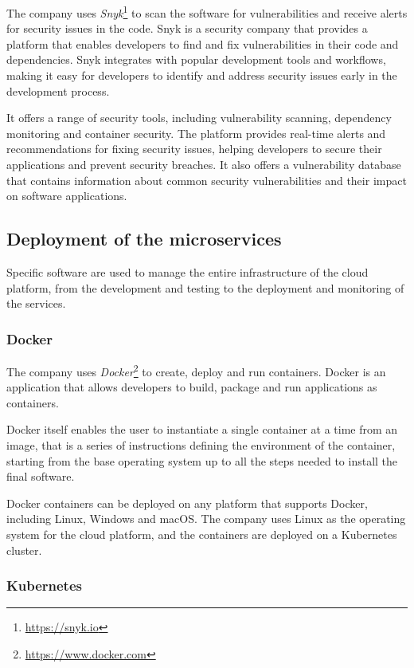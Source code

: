 The company uses \textit{Snyk}\footnote{\url{https://snyk.io}} to scan the software for vulnerabilities and receive alerts for security issues in the code. Snyk is a security company that provides a platform that enables developers to find and fix vulnerabilities in their code and dependencies. Snyk integrates with popular development tools and workflows, making it easy for developers to identify and address security issues early in the development process.

It offers a range of security tools, including vulnerability scanning, dependency monitoring and container security. The platform provides real-time alerts and recommendations for fixing security issues, helping developers to secure their applications and prevent security breaches. It also offers a vulnerability database that contains information about common security vulnerabilities and their impact on software applications.

\subsection{Deployment of the microservices}

Specific software are used to manage the entire infrastructure of the cloud platform, from the development and testing to the deployment and monitoring of the services.

\subsubsection{Docker}

The company uses \textit{Docker}\footnote{\url{https://www.docker.com}} to create, deploy and run containers. Docker is an application that allows developers to build, package and run applications as containers.

Docker itself enables the user to instantiate a single container at a time from an image, that is a series of instructions defining the environment of the container, starting from the base operating system up to all the steps needed to install the final software.

Docker containers can be deployed on any platform that supports Docker, including Linux, Windows and macOS. The company uses Linux as the operating system for the cloud platform, and the containers are deployed on a Kubernetes cluster.

\subsubsection{Kubernetes}

